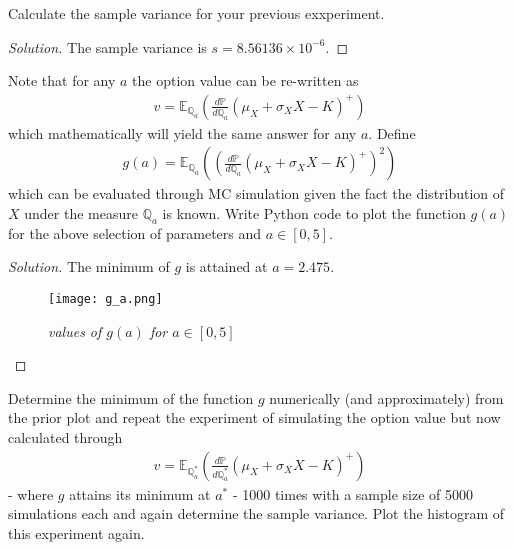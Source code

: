 \documentclass[10pt]{article}
\newcommand{\E}{\mathbb{E}}
\newcommand{\Q}{\mathbb{Q}}
\newenvironment{problem}[2][Problem]{\begin{trivlist}
\item[\hskip \labelsep {\bfseries #1}\hskip \labelsep {\bfseries #2.}]}{\end{trivlist}}
\begin{document}
\begin{problem}{5}
    Calculate the sample variance for your previous exxperiment.
\end{problem}
    
\begin{proof}[Solution]
    The sample variance is $s = 8.56136 \times 10^{-6}$.
\end{proof}



\begin{problem}{6}
    Note that for any $a$ the option value can be re-written as
    \begin{align*}
        v = \E_{\Q_a} \left(\frac{d\mathbb{P}}{d\Q_a} (\mu_X + \sigma_X X - K)^+\right)
    \end{align*}
    which mathematically will yield the same answer for any $a$. Define
    \begin{align*}
        g(a) = \E_{\Q_a} \left( \left(\frac{d\mathbb{P}}{d\Q_a} (\mu_X + \sigma_X X - K)^+\right)^2 \right)
    \end{align*}
    which can be evaluated through MC simulation given the fact the distribution of $X$ under the measure $\Q_a$ is known.
    Write Python code to plot the function $g(a)$ for the above selection of parameters and $a \in [0, 5]$.
\end{problem}
    
\begin{proof}[Solution]
    The minimum of $g$ is attained at $a = 2.475$.
    \begin{figure}[H]
        \begin{center}
            \texttt{[image: g\_a.png]}
            \caption{\textit{values of $g(a)$ for $a \in [0, 5]$}}
            \label{fig:g_a}
        \end{center}
    \end{figure}
\end{proof}



\begin{problem}{7}
    Determine the minimum of the function $g$ numerically (and approximately) from the prior plot and repeat the experiment of simulating the option value but now calculated through
    \begin{align*}
        v = \E_{\Q_a^*} \left(\frac{d\mathbb{P}}{d\Q_a^*} (\mu_X + \sigma_X X - K)^+\right)
    \end{align*}
    - where $g$ attains its minimum at $a^*$ - 1000 times with a sample size of 5000 simulations each and again determine the sample variance.
    Plot the histogram of this experiment again.
\end{problem}
    
\end{document}
